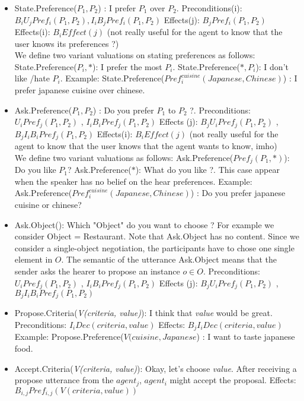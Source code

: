 \documentclass{llncs}
\begin{document}
 \begin{itemize}
 \item State.Preference(\textit{$P_{1}, P_{2}$}) : I prefer $P_{1}$ over $P_{2}$.
 \subitem Preconditions(i):  $ B_{i} U_{j} Pref_{i}(P_{1}, P_{2}), I_{i} B_{j} Pref_{i}(P_{1}, P_{2})$
 \subitem Effects(j): $ B_{j} Pref_{i}(P_{1}, P_{2})$
 \subitem Effects(i): $ B_i Effect(j)$ (not really useful for the agent to know that the user knows its preferences ?)
 \\ We define two variant valuations on stating preferences as follows: 
 \subitem State.Preference(\textit{$P_{i}, *$}): I prefer the most $P_{i}$.
 \subitem State.Preference(\textit{$*, P_{i}$}): I don't like /hate $P_{i}$.
\subitem Example: State.Preference(\textit{$Pref_{i}^{cuisine} (Japanese , Chinese)$}) : I prefer japanese cuisine over chinese.
 \item Ask.Preference(\textit{$P_{1}, P_{2}$}) : Do you prefer $P_{1}$ to $P_{2}$ ?. 
  \subitem Preconditions:  $ U_{i} Pref_{j}(P_{1}, P_{2})$ ,  $ I_{i} B_{i} Pref_{j}(P_{1}, P_{2})$
  \subitem Effects (j):  $B_{j} U_{i} Pref_{j}(P_{1}, P_{2})$ ,  $ B_{j} I_{i} B_{i}Pref_{j}(P_{1}, P_{2})$
   \subitem Effects(i): $ B_i Effect(j)$ (not really useful for the agent to know that the user knows that the agent wants to know, imho)
 \\We define two variant valuations as follows: 
 \subitem Ask.Preference(\textit{$Pref_{j}(P_{1}, *)$}): Do you like $P_{1}$?
 \subitem Ask.Preference(\textit{$*$}): What do you like ?. This case appear when the speaker has no belief on the hear preferences. 
 \subitem Example: Ask.Preference(\textit{$Pref_{i}^{cuisine} (Japanese , Chinese)$}) : Do you prefer japanese cuisine or chinese?

 \item Ask.Object(): Which "Object" do you want to choose ? For example we consider Object = Restaurant. Note that Ask.Object has no content. Since we consider a single-object negotiation, the participants have to chose one single element in $O$. The semantic of the utterance Ask.Object means that the sender asks the hearer to propose an instance $o\in O$.
	\subitem Preconditions:  $ U_{i} Pref_{j}(P_{1}, P_{2})$ ,  $ I_{i} B_{i} Pref_{j}(P_{1}, P_{2})$
  	\subitem Effects (j):  $B_{j} U_{i} Pref_{j}(P_{1}, P_{2})$ ,  $ B_{j} I_{i} B_{i}Pref_{j}(P_{1}, P_{2})$
 
 \item Propose.Criteria(\textit{V(criteria, value)}): I think that \textit{value}  would be great. 
  \subitem Preconditions:  $ I_{i} Dec(criteria, value) $
  \subitem Effects:  $B_{j} I_{i} Dec(criteria, value)$
   \subitem Example: Propose.Preference(\textit{$V(cuisine,Japanese$}) : I want to taste japanese food.
 \item Accept.Criteria(\textit{V(criteria, value)}): Okay, let's choose \textit{value}. After receiving a propose utterance from the $agent_{j}$,  $agent_{i}$ might accept the proposal.
   \subitem Effects:  $B_{i,j} Pref_{i,j}(V(criteria, value))$
   

\end{itemize}
\end{document}
